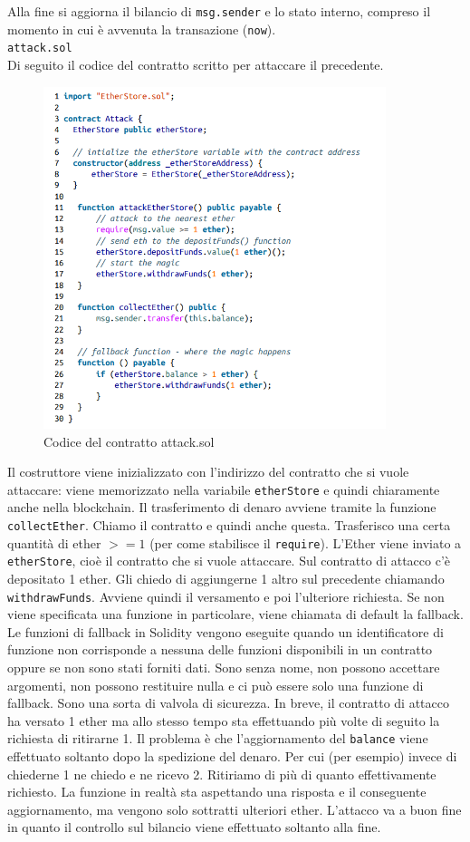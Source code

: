 Alla fine si aggiorna il bilancio di \verb|msg.sender| e lo stato interno,
compreso il momento in
cui è avvenuta la transazione (\verb|now|).\ \\

\verb|attack.sol|\ \\
Di seguito il codice del contratto scritto per attaccare il precedente.

\begin{figure}[H]
    \centering
    \includegraphics[width=10cm, keepaspectratio]{capitoli/ethereum/imgs/dao_cattivo.png}
    \caption{Codice del contratto attack.sol}
\end{figure}

Il costruttore viene inizializzato con l'indirizzo del contratto che si vuole
attaccare: viene memorizzato nella variabile \verb|etherStore| e quindi
chiaramente anche nella blockchain.
Il trasferimento di denaro avviene tramite la funzione \verb|collectEther|.
Chiamo il contratto e
quindi anche questa. Trasferisco una certa quantità di ether $ >=1$
(per come stabilisce il \verb|require|). L'Ether viene inviato a \verb|etherStore|,
cioè il contratto che si vuole attaccare.
Sul contratto di attacco c'è depositato 1 ether.
Gli chiedo di aggiungerne 1 altro sul precedente chiamando \verb|withdrawFunds|.
Avviene quindi il versamento e poi l'ulteriore
richiesta.
Se non viene specificata una funzione in particolare,
viene chiamata di default la fallback.
Le funzioni di fallback in Solidity vengono eseguite quando un identificatore di
funzione non corrisponde a nessuna delle funzioni disponibili in un contratto
oppure se non sono stati
forniti dati. Sono senza nome, non possono accettare argomenti, non possono
restituire nulla e ci può essere solo una funzione di fallback.
Sono una sorta di valvola di sicurezza.
In breve, il contratto di attacco ha versato 1 ether ma allo stesso tempo sta
effettuando più volte di seguito la richiesta di ritirarne 1.
Il problema è che l'aggiornamento del \verb|balance| viene
effettuato soltanto dopo la spedizione del denaro. Per cui (per esempio) invece
di chiederne 1 ne chiedo e ne ricevo 2.
Ritiriamo di più di quanto effettivamente richiesto.
La funzione in realtà sta aspettando una risposta e il conseguente aggiornamento, ma
vengono solo sottratti ulteriori ether. L'attacco va a buon fine in quanto il controllo sul
bilancio viene effettuato soltanto alla fine.

